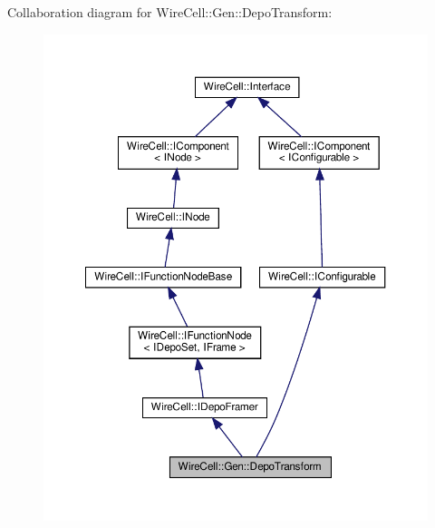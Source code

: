 Collaboration diagram for Wire\+Cell\+:\+:Gen\+:\+:Depo\+Transform\+:
\nopagebreak
\begin{figure}[H]
\begin{center}
\leavevmode
\includegraphics[width=350pt]{class_wire_cell_1_1_gen_1_1_depo_transform__coll__graph}
\end{center}
\end{figure}
